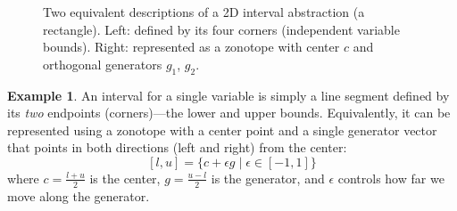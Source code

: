 \documentclass[oneside,11pt,dvipsnames]{book}
\numberwithin{equation}{section}
\theoremstyle{definition}
\newtheorem{example}{Example}[section]
\theoremstyle{remark}
\begin{document}
\begin{figure}
\centering
{}
\caption{Two equivalent descriptions of a 2D interval abstraction (a rectangle).
Left: defined by its four corners (independent variable bounds).
Right: represented as a zonotope with center $c$ and orthogonal generators $g_1$, $g_2$.}
\label{fig:interval-rectangle-two-views}
\end{figure}



\begin{example}\label{ex:interval-zonotope}
  An interval for a single variable is simply a line segment defined by its \emph{two} endpoints (corners)---the lower and upper bounds. Equivalently, it can be represented using a zonotope with a center point and a single generator vector that points in both directions (left and right) from the center:
  \[
    [l, u] = \{ c + \epsilon g \mid \epsilon \in [-1, 1] \}
  \]
    where \(c = \frac{l + u}{2}\) is the center, \(g = \frac{u - l}{2}\) is the generator, and \(\epsilon\) controls how far we move along the generator.
\end{example}
\end{document}
